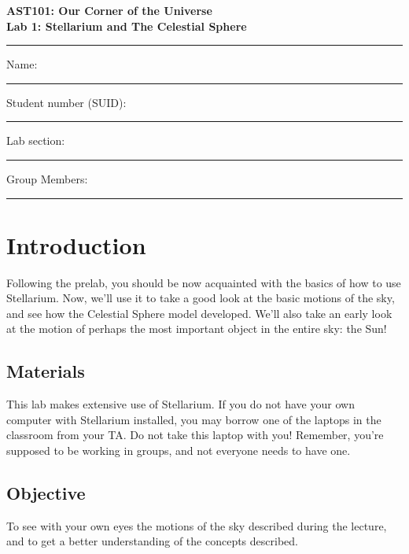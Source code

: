 \documentclass[11pt]{article}
\begin{document}
\begin{center}
\textbf{\Large
AST101: Our Corner of the Universe \\
\vspace*{0.1cm}
Lab 1: Stellarium and The Celestial Sphere
}
\end{center}

\vspace*{0.5cm}

\hrule
{\Large Name:}\vspace*{0.5cm}\\\hrule
{\Large Student number (SUID):}\vspace*{0.5cm}\\\hrule
{\Large Lab section:}\vspace*{0.5cm}\\\hrule
{\Large Group Members:}\vspace*{0.5cm}\\\hrule
\vspace*{0.5cm}

\section{Introduction}

Following the prelab, you should be now acquainted with the basics of how to use Stellarium. Now, we'll use it to take a good look at the basic motions of the sky, and see how the Celestial Sphere model developed. We'll also take an early look at the motion of perhaps the most important object in the entire sky: the Sun!

\subsection*{Materials}

This lab makes extensive use of Stellarium. If you do not have your own computer with Stellarium installed, you may borrow one of the laptops in the classroom from your TA. Do not take this laptop with you! Remember, you're supposed to be working in groups, and not everyone needs to have one.

\subsection*{Objective}

To see with your own eyes the motions of the sky described during the lecture, and to get a better understanding of the concepts described.
\end{document}

